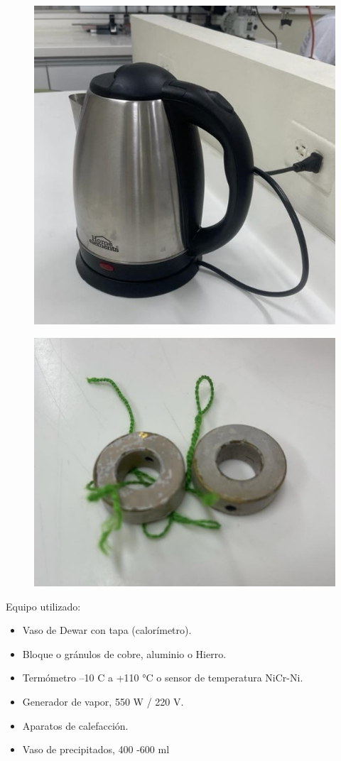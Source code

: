 \documentclass[letterpaper, 12pt]{article}
\begin{document}
\begin{figure}[H]
      \begin{center}
            \includegraphics[width=.5\linewidth]{./Images/Montaje3.jpg}
            \caption{}
      \end{center}
\end{figure}

\begin{figure}[H]
      \begin{center}
            \includegraphics[width=.5\linewidth]{./Images/Montaje4.jpg}
            \caption{}
      \end{center}
\end{figure}

Equipo utilizado:

\begin{itemize}
      \item Vaso de Dewar con tapa (calorímetro).

      \item Bloque o gránulos de cobre, aluminio o Hierro.

      \item Termómetro –10 C a +110 °C o sensor de temperatura NiCr-Ni.

      \item Generador de vapor, 550 W / 220 V.

      \item Aparatos de calefacción.

      \item Vaso de precipitados, 400 -600 ml
\end{itemize}
\end{document}
